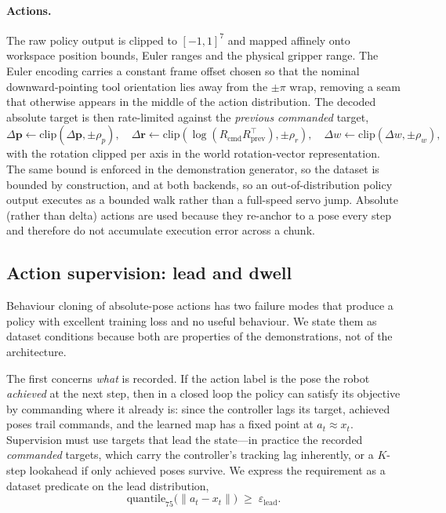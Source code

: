 \paragraph{Actions.}
The raw policy output is clipped to $[-1,1]^7$ and mapped affinely onto workspace position
bounds, Euler ranges and the physical gripper range. The Euler encoding carries a constant
frame offset chosen so that the nominal downward-pointing tool orientation lies away from the
$\pm\pi$ wrap, removing a seam that otherwise appears in the middle of the action
distribution. The decoded absolute target is then rate-limited against the \emph{previous
commanded} target,
\begin{equation}
  \Delta \mathbf{p} \leftarrow \mathrm{clip}(\Delta \mathbf{p}, \pm\rho_{p}), \quad
  \Delta \mathbf{r} \leftarrow \mathrm{clip}(\log(R_{\text{cmd}}R_{\text{prev}}^{\!\top}), \pm\rho_{r}), \quad
  \Delta w \leftarrow \mathrm{clip}(\Delta w, \pm\rho_{w}),
  \label{eq:rate}
\end{equation}
with the rotation clipped per axis in the world rotation-vector representation. The same
bound is enforced in the demonstration generator, so the dataset is bounded by construction,
and at both backends, so an out-of-distribution policy output executes as a bounded walk
rather than a full-speed servo jump. Absolute (rather than delta) actions are used because
they re-anchor to a pose every step and therefore do not accumulate execution error across a
chunk.

\subsection{Action supervision: lead and dwell}
\label{sec:method:supervision}

Behaviour cloning of absolute-pose actions has two failure modes that produce a policy with
excellent training loss and no useful behaviour. We state them as dataset conditions because
both are properties of the demonstrations, not of the architecture.

The first concerns \emph{what} is recorded. If the action label is the pose the robot
\emph{achieved} at the next step, then in a closed loop the policy can satisfy its objective
by commanding where it already is: since the controller lags its target, achieved poses trail
commands, and the learned map has a fixed point at $a_t \approx x_t$. Supervision must use
targets that lead the state---in practice the recorded \emph{commanded} targets, which carry
the controller's tracking lag inherently, or a $K$-step lookahead if only achieved poses
survive. We express the requirement as a dataset predicate on the lead distribution,
\begin{equation}
  \mathrm{quantile}_{75}\bigl(\lVert a_t - x_t \rVert\bigr) \;\ge\; \varepsilon_{\text{lead}} .
  \label{eq:lead}
\end{equation}

